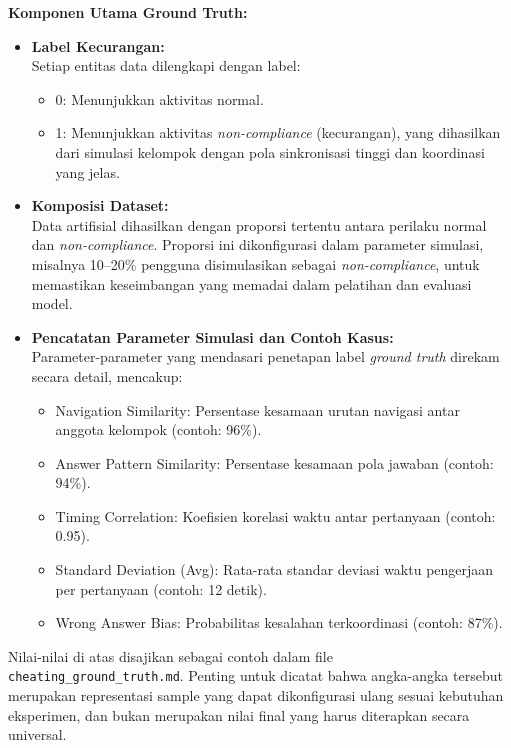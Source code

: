 \textbf{Komponen Utama Ground Truth:}
\begin{itemize}
    \item \textbf{Label Kecurangan:} \\
    Setiap entitas data dilengkapi dengan label:
    \begin{itemize}
        \item 0: Menunjukkan aktivitas normal.
        \item 1: Menunjukkan aktivitas \textit{non-compliance} (kecurangan), yang dihasilkan dari simulasi kelompok dengan pola sinkronisasi tinggi dan koordinasi yang jelas.
    \end{itemize}
    \item \textbf{Komposisi Dataset:} \\
    Data artifisial dihasilkan dengan proporsi tertentu antara perilaku normal dan \textit{non-compliance}. Proporsi ini dikonfigurasi dalam parameter simulasi, misalnya 10–20\% pengguna disimulasikan sebagai \textit{non-compliance}, untuk memastikan keseimbangan yang memadai dalam pelatihan dan evaluasi model.
    \item \textbf{Pencatatan Parameter Simulasi dan Contoh Kasus:} \\
    Parameter-parameter yang mendasari penetapan label \textit{ground truth} direkam secara detail, mencakup:
    \begin{itemize}
        \item Navigation Similarity: Persentase kesamaan urutan navigasi antar anggota kelompok (contoh: 96\%).
        \item Answer Pattern Similarity: Persentase kesamaan pola jawaban (contoh: 94\%).
        \item Timing Correlation: Koefisien korelasi waktu antar pertanyaan (contoh: 0.95).
        \item Standard Deviation (Avg): Rata-rata standar deviasi waktu pengerjaan per pertanyaan (contoh: 12 detik).
        \item Wrong Answer Bias: Probabilitas kesalahan terkoordinasi (contoh: 87\%).
    \end{itemize}
\end{itemize}

Nilai-nilai di atas disajikan sebagai contoh dalam file \texttt{cheating\_ground\_truth.md}. Penting untuk dicatat bahwa angka-angka tersebut merupakan representasi sample yang dapat dikonfigurasi ulang sesuai kebutuhan eksperimen, dan bukan merupakan nilai final yang harus diterapkan secara universal.

